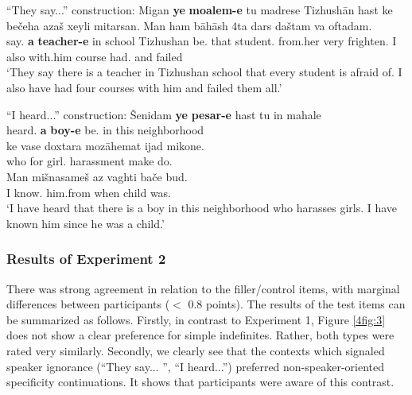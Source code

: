 \documentclass[output=paper]{langsci/langscibook}
\begin{document}
\begin{exe}
\ex\label{4ex:35}
``They say...'' construction:
\exi{}
\gll	Migan {\bf{ye}} {\bf{moalem-e}} tu madrese Tizhushān hast ke bečeha azaš xeyli mitarsan. Man ham bāhāsh 4ta dars daštam va oftadam. \\
	say.{} {\bf{a}} {\bf{teacher-e}} in school Tizhushan be.{} that	 student.{} from.her very frighten.{} I also with.him {} course had.{} and failed \\
\glt	`They say there is a teacher in Tizhushan school that every student is afraid of. I also have had four courses with him and failed them all.'

\ex\label{4ex:36}
``I heard...'' construction:
\exi{}
\gll Šenidam {\bf{ye}} {\bf{pesar-e}} hast tu in mahale \\
heard.{} {\bf{a}} {\bf{boy-e}} be.{} in this neighborhood \\
\glt
\exi{}
\gll ke vase doxtara mozāhemat ijad mikone. \\
who for girl.{} harassment make do.{} \\
\glt
\exi{}
\gll Man mišnasameš az vaghti bače bud. \\
I know.{} him.from when child was.{} \\
\glt `I have heard that there is a boy in this neighborhood who harasses girls. I have known him since he was a child.'


\end{exe}

\subsubsection{Results of Experiment 2}\label{4sec:522}
There was strong agreement in relation to the filler/control items, with marginal differences between participants ($<$ 0.8 points). The results of the test items can be summarized as follows. Firstly, in contrast to Experiment 1, Figure \ref{4fig:3} does not show a clear preference for simple indefinites. Rather, both types were rated very similarly. Secondly, we clearly see that the contexts which signaled speaker ignorance (``They say... '', ``I heard...'') preferred non-speaker-oriented specificity continuations. It shows that participants were aware of this contrast.
\end{document}
